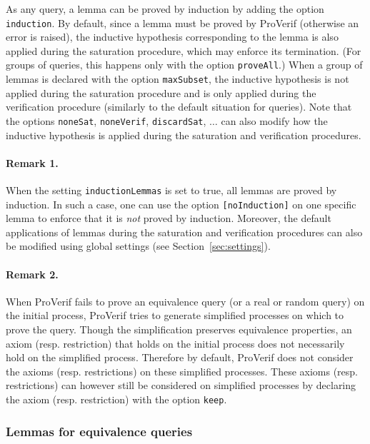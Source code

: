 \documentclass{book}
\begin{document}
As any query, a lemma can be proved by induction by adding the option \lstinline!induction!. By default, since a lemma must be proved by ProVerif (otherwise an error is raised), the inductive hypothesis corresponding to the lemma is also applied during the saturation procedure, which may enforce its termination. (For groups of queries, this happens only with the option \lstinline!proveAll!.) When a group of lemmas is declared with the option \lstinline!maxSubset!, the inductive hypothesis is not applied during the saturation procedure and is only applied during the verification procedure (similarly to the default situation for queries).
Note that the options \lstinline!noneSat!, \lstinline!noneVerif!, \lstinline!discardSat!, $\ldots$ can also modify how the inductive hypothesis is applied during the saturation and verification procedures.

\paragraph{Remark 1.} When the setting \lstinline!inductionLemmas! is set to true, all lemmas are proved by induction. In such a case, one can use the option \lstinline![noInduction]! on one specific lemma to enforce that it is \emph{not} proved by induction. Moreover, the default applications of lemmas during the saturation and verification procedures can also be modified using global settings (see Section~\ref{sec:settings}).

\paragraph{Remark 2.} When ProVerif fails to prove an equivalence query (or a real or random query) on the initial process, ProVerif tries to generate simplified processes on which to prove the query. Though the simplification preserves equivalence properties, an axiom (resp. restriction) that holds on the initial process does not necessarily hold on the simplified process. Therefore by default, ProVerif does not consider the axioms (resp. restrictions) on these simplified processes. These axioms (resp. restrictions) can however still be considered on simplified processes by declaring the axiom (resp. restriction) with the option \lstinline!keep!.

\subsubsection{Lemmas for equivalence queries}
\end{document}
